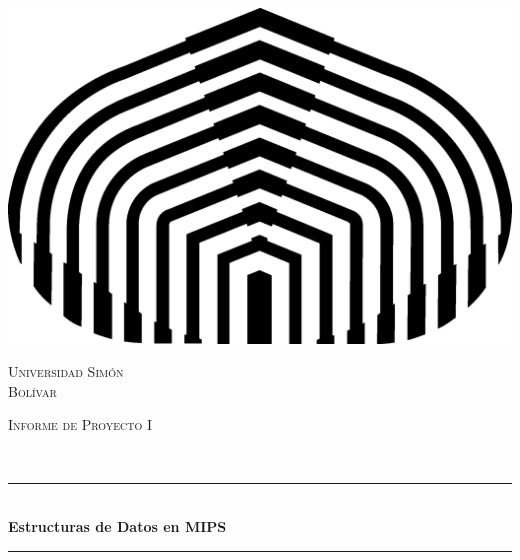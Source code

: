 \documentclass[11pt]{article}
\begin{document}

\begin{center} 
   \newcommand{\HRule}{\rule{\linewidth}{0.5mm}}  

   \begin{minipage}{0.48\textwidth}
      \begin{center}
         \includegraphics[scale = 0.5]{logo.png}
      \end{center}
   \end{minipage}

   \vspace*{1.0cm}                       
   \textsc{\huge Universidad Simón \\ \vspace{5px} Bolívar} \\ [1.5cm] 

   \begin{minipage}{0.9\textwidth} 
      \begin{center}                                                             
         \textsc{\LARGE Informe de Proyecto I }
      \end{center}
   \end{minipage} \\ [3cm]

   \vspace*{1cm}                                                                              
   \HRule \\ [0.4cm]                                                  
   {\huge \bfseries Estructuras de Datos en MIPS} \\ [0.4cm] 
   \HRule \\ [4cm]


\end{center}
\end{document}
